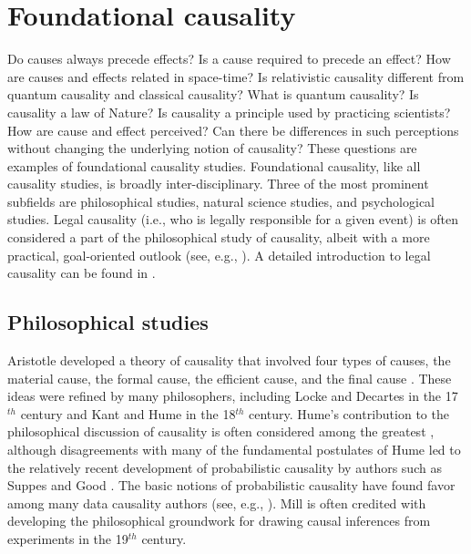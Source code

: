 \section{Foundational causality}
Do causes always precede effects?  Is a cause required to precede an effect?  How are causes and effects related in space-time?  Is relativistic causality different from quantum causality and classical causality?  What is quantum causality?  Is causality a law of Nature?  Is causality a principle used by practicing scientists?  How are cause and effect perceived?  Can there be differences in such perceptions without changing the underlying notion of causality?  These questions are examples of foundational causality studies.  Foundational causality, like all causality studies, is broadly inter-disciplinary.  Three of the most prominent subfields are philosophical studies, natural science studies, and psychological studies.  Legal causality (i.e., who is legally responsible for a given event) is often considered a part of the philosophical study of causality, albeit with a more practical, goal-oriented outlook (see, e.g., \cite{Honore2010,Young2007}).  A detailed introduction to legal causality can be found in \cite{Illari2014}.

\subsection{Philosophical studies} 
Aristotle developed a theory of causality that involved four types of causes, the material cause, the formal cause, the efficient cause, and the final cause \cite{Falcon2008,Evans1959,Holland1986,Zheng2010}.  These ideas were refined by many philosophers, including Locke \cite{Locke1700} and Decartes \cite{Descartes1830} in the 17$^{th}$ century and Kant \cite{Kant1855} and Hume \cite{Hume1888} in the 18$^{th}$ century.  Hume's contribution to the philosophical discussion of causality is often considered among the greatest \cite{Holland1986,Zheng2010,Pearl2000,Illari2014}, although disagreements with many of the fundamental postulates of Hume led to the relatively recent development of probabilistic causality by authors such as Suppes \cite{Suppes1970} and Good \cite{Good1984}.  The basic notions of probabilistic causality have found favor among many data causality authors (see, e.g., \cite{Zheng2010,Illari2014,Kleinberg2012}).  Mill is often credited with developing the philosophical groundwork for drawing causal inferences from experiments \cite{Mill1858} in the 19$^{th}$ century.  


